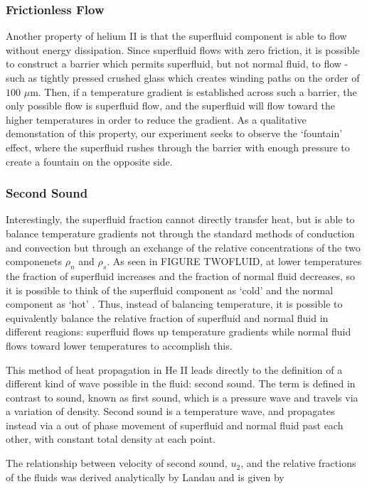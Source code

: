 \subsubsection{Frictionless Flow}
Another property of helium II is that the superfluid component is able
to flow without energy dissipation. Since superfluid flows with zero
friction, it is possible to construct a barrier which permits
superfluid, but not normal fluid, to flow - such as tightly pressed
crushed glass which creates winding paths on the order of $100$
$\mu$m. Then, if a temperature gradient is established across such a
barrier, the only possible flow is superfluid flow, and the superfluid
will flow toward the higher temperatures in order to reduce the
gradient. As a qualitative demonstation of this property, our
experiment seeks to observe the `fountain' effect, where the
superfluid rushes through the barrier with enough pressure to create a
fountain on the opposite side.

\subsubsection{Second Sound}
Interestingly, the superfluid fraction cannot directly transfer heat,
but is able to balance temperature gradients not through the standard
methods of conduction and convection but through an exchange of the
relative concentrations of the two componenets $\rho_n$ and
$\rho_s$. As seen in FIGURE TWOFLUID, at lower temperatures the
fraction of superfluid increases and the fraction of normal fluid
decreases, so it is possible to think of the superfluid component as
`cold' and the normal component as `hot' \cite{atkins}. Thus, instead
of balancing temperature, it is possible to equivalently balance the
relative fraction of superfluid and normal fluid in different
reagions: superfluid flows up temperature gradients while normal fluid
flows toward lower temperatures to accomplish this.

This method of heat propagation in He II leads directly to the
definition of a different kind of wave possible in the fluid: second
sound. The term is defined in contrast to sound, known as first sound,
which is a pressure wave and travels via a variation of
density. Second sound is a temperature wave, and propagates instead
via a out of phase movement of superfluid and normal fluid past each
other, with constant total density at each point.

The relationship between velocity of second sound, $u_2$, and the
relative fractions of the fluids was derived analytically by Landau
and is given by

